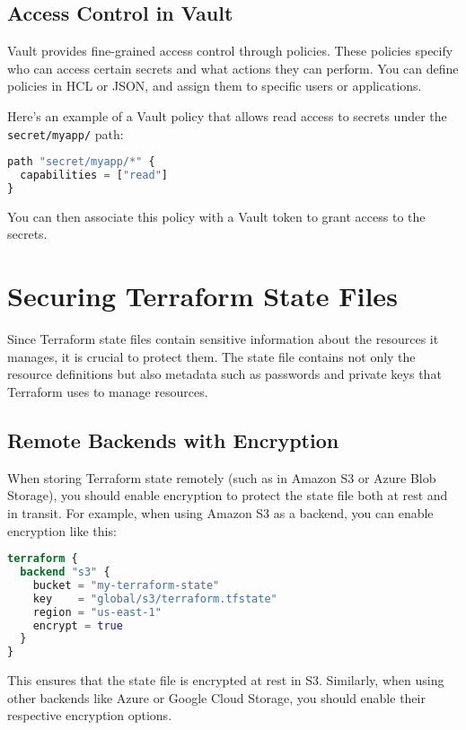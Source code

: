 \subsection{Access Control in Vault}

Vault provides fine-grained access control through policies. These policies specify who can access certain secrets and what actions they can perform. You can define policies in HCL or JSON, and assign them to specific users or applications.

Here's an example of a Vault policy that allows read access to secrets under the \texttt{secret/myapp/} path:

\begin{lstlisting}[language=terraform]
path "secret/myapp/*" {
  capabilities = ["read"]
}
\end{lstlisting}

You can then associate this policy with a Vault token to grant access to the secrets.

\section{Securing Terraform State Files}

Since Terraform state files contain sensitive information about the resources it manages, it is crucial to protect them. The state file contains not only the resource definitions but also metadata such as passwords and private keys that Terraform uses to manage resources.

\subsection{Remote Backends with Encryption}

When storing Terraform state remotely (such as in Amazon S3 or Azure Blob Storage), you should enable encryption to protect the state file both at rest and in transit. For example, when using Amazon S3 as a backend, you can enable encryption like this:

\begin{lstlisting}[language=terraform]
terraform {
  backend "s3" {
    bucket = "my-terraform-state"
    key    = "global/s3/terraform.tfstate"
    region = "us-east-1"
    encrypt = true
  }
}
\end{lstlisting}

This ensures that the state file is encrypted at rest in S3. Similarly, when using other backends like Azure or Google Cloud Storage, you should enable their respective encryption options.

